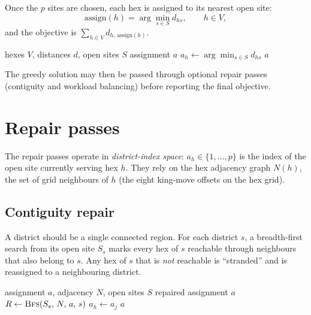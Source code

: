 \documentclass[11pt]{article}
\begin{document}
Once the $p$ sites are chosen, each hex is assigned to its nearest open site:
\[
  \text{assign}(h) = \arg\min_{s \in S} d_{hs}, \qquad h \in V,
\]
and the objective is $\sum_{h \in V} d_{h,\,\text{assign}(h)}$.

\begin{algorithm}[h]
\caption{Nearest-site assignment}
\label{alg:assign}
\begin{algorithmic}[1]
  \Require hexes $V$, distances $d$, open sites $S$
  \Ensure assignment $a$
    \State $a_h \gets \displaystyle\arg\min_{s \in S} d_{hs}$
  \EndFor
  \State \Return $a$
\end{algorithmic}
\end{algorithm}

The greedy solution may then be passed through optional repair passes
(contiguity and workload balancing) before reporting the final objective.

\section{Repair passes}

The repair passes operate in \emph{district-index space}: $a_h \in \{1,\dots,p\}$
is the index of the open site currently serving hex $h$. They rely on the hex
adjacency graph $N(h)$, the set of grid neighbours of $h$ (the eight
king-move offsets on the hex grid).

\subsection*{Contiguity repair}

A district should be a single connected region. For each district $s$, a
breadth-first search from its open site $S_s$ marks every hex of $s$ reachable
through neighbours that also belong to $s$. Any hex of $s$ that is \emph{not}
reachable is ``stranded'' and is reassigned to a neighbouring district.

\begin{algorithm}[h]
\caption{Contiguity repair}
\label{alg:contig}
\begin{algorithmic}[1]
  \Require assignment $a$, adjacency $N$, open sites $S$
  \Ensure repaired assignment $a$
    \State $R \gets \textsc{Bfs}(S_s,\, N,\, a,\, s)$
        \State $a_h \gets a_j$
      \EndIf
    \EndFor
  \EndFor
  \State \Return $a$
\end{algorithmic}
\end{algorithm}
\end{document}
